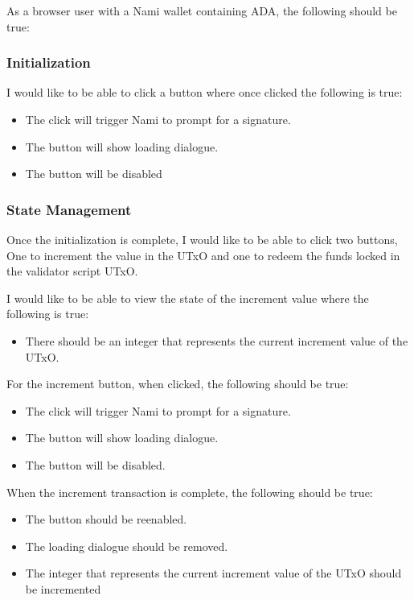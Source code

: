 \documentclass{article}
\begin{document}
As a browser user with a Nami wallet containing ADA, the following should be true:

\subsubsection{Initialization}

I would like to be able to click a button where once clicked the following is true:

\begin{itemize}
  \item The click will trigger Nami to prompt for a signature.
  \item The button will show loading dialogue.
  \item The button will be disabled
\end{itemize}

\subsubsection{State Management}

Once the initialization is complete, I would like to be able to click two buttons,
One to increment the value in the UTxO and one to redeem the funds locked in the
validator script UTxO.

I would like to be able to view the state of the increment value where the following
is true:

\begin{itemize}
  \item There should be an integer that represents the current increment value of the
        UTxO.
\end{itemize}

For the increment button, when clicked, the following should be true:

\begin{itemize}
  \item The click will trigger Nami to prompt for a signature.
  \item The button will show loading dialogue.
  \item The button will be disabled.
\end{itemize}

When the increment transaction is complete, the following should be true:

\begin{itemize}
  \item The button should be reenabled.
  \item The loading dialogue should be removed.
  \item The integer that represents the current increment value of the
        UTxO should be incremented
\end{itemize}
\end{document}
